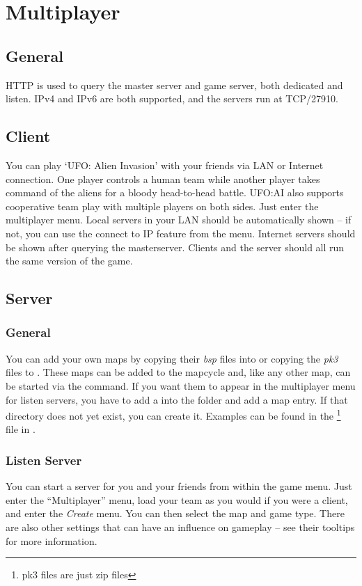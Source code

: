 \section{Multiplayer}
\subsection{General}
HTTP is used to query the master server and game server, both dedicated and listen.  IPv4 and IPv6 are both supported, and the servers run at TCP/27910.

\subsection{Client}
You can play `UFO: Alien Invasion' with your friends via LAN or Internet connection. One player controls a human team while another player takes command of the aliens for a bloody head-to-head battle. UFO:AI also supports cooperative team play with multiple players on both sides. Just enter the multiplayer menu. Local servers in your LAN should be automatically shown -- if not, you can use the connect to IP feature from the menu. Internet servers should be shown after querying the masterserver. Clients and the server should all run the same version of the game.

\subsection{Server}

\subsubsection{General}
You can add your own maps by copying their \emph{bsp} files into  or copying the \emph{pk3} files to . These maps can be added to the mapcycle and, like any other map, can be started via the  command. If you want them to appear in the multiplayer menu for listen servers, you have to add a  into the  folder and add a map entry. If that directory does not yet exist, you can create it. 
Examples can be found in the \footnote{pk3 files are just zip files} file in .

\subsubsection{Listen Server}
You can start a server for you and your friends from within the game menu. Just enter the ``Multiplayer'' menu, load your team as you would if you were a client, and enter the \emph{Create} menu. You can then select the map and game type. There are also other settings that can have an influence on gameplay -- see their tooltips for more information.

